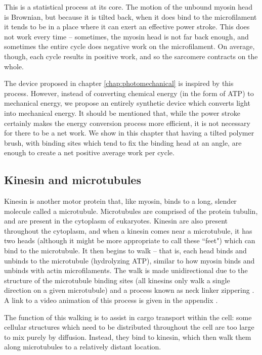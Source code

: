 \documentclass[11pt]{ucthesis}
\begin{document}
This is a statistical process at its core. The motion of the unbound myosin head is Brownian, but because it is tilted back, when it does bind to the microfilament it tends to be in a place where it can exert an effective power stroke. This does not work every time -- sometimes, the myosin head is not far back enough, and sometimes the entire cycle does negative work on the microfilament. On average, though, each cycle results in positive work, and so the sarcomere contracts on the whole.

The device proposed in chapter \ref{chap:photomechanical} is inspired by this process. However, instead of converting chemical energy (in the form of ATP) to mechanical energy, we propose an entirely synthetic device which converts light into mechanical energy. It should be mentioned that, while the power stroke certainly makes the energy conversion process more efficient, it is not necessary for there to be a net work. We show in this chapter that having a tilted polymer brush, with binding sites which tend to fix the binding head at an angle, are enough to create a net positive average work per cycle.

\subsection{Kinesin and microtubules}
\label{sec:kinesinMT}

Kinesin is another motor protein that, like myosin, binds to a long, slender molecule called a microtubule. Microtubules are comprised of the protein tubulin, and are present in the cytoplasm of eukaryotes. Kinesin are also present throughout the cytoplasm, and when a kinesin comes near a microtubule, it has two heads (although it might be more appropriate to call these ``feet") which can bind to the microtubule. It then begins to walk -- that is, each head binds and unbinds to the microtubule (hydrolyzing ATP), similar to how myosin binds and unbinds with actin microfilaments. The walk is made unidirectional due to the structure of the microtubule binding sites (all kinesins only walk a single direction on a given microtubule) and a process known as neck linker zippering \cite{rice1999structural}. A link to a video animation of this process is given in the appendix \cite{vale2000way}.

The function of this walking is to assist in cargo transport within the cell: some cellular structures which need to be distributed throughout the cell are too large to mix purely by diffusion. Instead, they bind to kinesin, which then walk them along microtubules to a relatively distant location.
\end{document}
